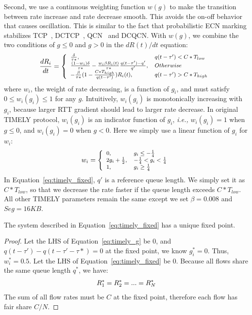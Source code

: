 Second, we use a continuous weighting function $w(g)$ to make the transition
between rate increase and rate decrease smooth. This avoids the on-off behavior
that causes oscillation.  This is similar to the fact that probabilistic ECN
marking stabilizes TCP~\cite{misra2000fluid}, DCTCP~\cite{dctcp-analysis},
QCN~\cite{qcn-analysis} and DCQCN. With $w(g)$, we combine the two conditions of
$g \le 0$ and $g>0$ in the $dR(t)/dt$ equation:
\begin{equation}
\small
\frac{{dR_i}}{{dt}} = \left\{ \begin{array}{ll}
\frac{\delta }{{\tau *}}, & q(t - \tau ') < C*{T_{low}}\\
\frac{{(1 - {w_i})\delta }}{{\tau *}} - \frac{{{w_i}\beta {R_i}(t)}}{{\tau *}}\frac{{q(t - \tau ') - q'}}{{q'}}, & Otherwise\\
 - \frac{\beta }{{\tau *}}(1 - \frac{{C*{T_{high}}}}{{q(t - \tau ')}})R_i(t), & q(t - \tau ') > C*{T_{high}}
\end{array} \right.\\
\label{eq:timely_fixed}
\end{equation}
where $w_i$, the weight of rate decreasing, is a function of $g_i$, and must satisfy $0 \le w_i(g_i) \le 1$ for any $g$. 
Intuitively, $w_i(g_i)$ is monotonically increasing with $g_i$, because larger RTT gradient should lead to larger 
rate decrease. In original TIMELY protocol, $w_i(g_i)$ is an indicator function of $g_i$, {\em i.e.,} 
$w_i(g_i)=1$ when $g \le 0$, and $w_i(g_i)=0$ when $g<0$. Here we simply use a linear function of $g_i$ for $w_i$:
\begin{equation}
\small
{w_i} = \left\{ \begin{array}{ll}
0, & {g_i \le  - \frac{1}{4}} \\
2{g_i} + \frac{1}{2}, & { - \frac{1}{4} < g_i < \frac{1}{4}} \\
1, & {g_i \ge \frac{1}{4}}
\end{array} \right.
\end{equation}
In Equation~\ref{eq:timely_fixed}, $q'$ is a reference queue length. We simply set it as $C*T_{low}$, 
so that we decrease the rate faster if the queue length exceeds $C*T_{low}$. All
other TIMELY
parameters remain the same except we set $\beta=0.008$ and $Seg=16KB$. 
\begin{thm}
The system described in Equation~\ref{eq:timely_fixed} has a unique fixed point.
\end{thm}
\begin{proof}
Let the LHS of Equation~\ref{eq:timely_g} be 0, and $q(t - \tau ') - q(t - \tau ' - \tau *) = 0$ at the fixed 
point, we know $g_i^*=0$. Thus, $w_i^*=0.5$. Let the LHS of Equation~\ref{eq:timely_fixed} be 0. Because
all flows share the same queue length $q^*$, we have:
\begin{equation}
\small
R_1^* = R_2^* = ... = R_N^*
\end{equation}
The sum of all flow rates must be $C$ at the fixed point, therefore each flow has fair share $C/N$. 
\end{proof}
